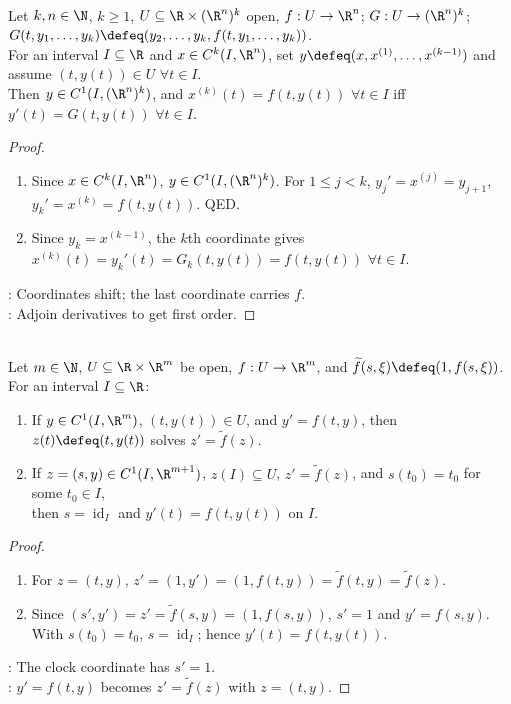 \begin{proposition} \label{prop:higher-order-ode-first-order-reduction} \\
Let $k,n\in\N$, $k\geq1$, $U\subseteq\R\times(\R^n)^k$ open, $f:U\to\R^n$; $G:U\to(\R^n)^k$; $G(t,y_1,\ldots,y_k)\defeq(y_2,\ldots,y_k,f(t,y_1,\ldots,y_k))$.\\
For an interval $I\subseteq\R$ and $x\in C^k(I,\R^n)$, set $y\defeq(x,x^{(1)},\ldots,x^{(k-1)})$ and assume $(t,y(t))\in U$ $\forall t\in I$.\\
Then $y\in C^1(I,(\R^n)^k)$, and $x^{(k)}(t)=f(t,y(t))$ $\forall t\in I$ iff $y'(t)=G(t,y(t))$ $\forall t\in I$.
\begin{proof}
\begin{enumerate}[label=\roman*.]
\setlength{\itemsep}{0pt}
\item[$(\Rightarrow)$] Since $x\in C^k(I,\R^n)$, $y\in C^1(I,(\R^n)^k)$. For $1\leq j<k$, $y_j'=x^{(j)}=y_{j+1}$, $y_k'=x^{(k)}=f(t,y(t))$. QED.
\item[$(\Leftarrow)$] Since $y_k=x^{(k-1)}$, the $k$th coordinate gives $x^{(k)}(t)=y_k'(t)=G_k(t,y(t))=f(t,y(t))$ $\forall t\in I$.
\end{enumerate}
: Coordinates shift; the last coordinate carries $f$.\\
: Adjoin derivatives to get first order.
\end{proof}
\end{proposition}

\begin{proposition} \label{prop:nonautonomous-system-autonomization} \\
Let $m\in\N$, $U\subseteq\R\times\R^m$ be open, $f:U\to\R^m$, and $\widetilde f(s,\xi)\defeq(1,f(s,\xi))$. For an interval $I\subseteq\R$:
\begin{enumerate}[label=(\roman*)]
\setlength{\itemsep}{0pt}
\item If $y\in C^1(I,\R^m)$, $(t,y(t))\in U$, and $y'=f(t,y)$, then $z(t)\defeq(t,y(t))$ solves $z'=\widetilde{f}(z)$.
\item If $z=(s,y)\in C^1(I,\R^{m+1})$, $z(I)\subseteq U$, $z'=\widetilde{f}(z)$, and $s(t_0)=t_0$ for some $t_0\in I$,\\
then $s=\operatorname{id}_I$ and $y'(t)=f(t,y(t))$ on $I$.
\end{enumerate}
\begin{proof}
\begin{enumerate}[label=(\roman*)]
\setlength{\itemsep}{0pt}
\item For $z=(t,y)$, $z'=(1,y')=(1,f(t,y))=\widetilde{f}(t,y)=\widetilde{f}(z)$.
\item Since $(s',y')=z'=\widetilde{f}(s,y)=(1,f(s,y))$, $s'=1$ and $y'=f(s,y)$.\\
With $s(t_0)=t_0$, $s=\operatorname{id}_I$; hence $y'(t)=f(t,y(t))$.
\end{enumerate}
: The clock coordinate has $s'=1$.\\
: $y'=f(t,y)$ becomes $z'=\widetilde{f}(z)$ with $z=(t,y)$.
\end{proof}
\end{proposition}

